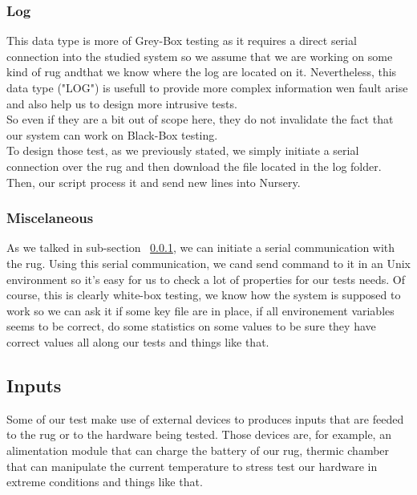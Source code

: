 \documentclass[12pt]{article}
\begin{document}
\subsubsection{Log}
\label{subsec:log}

This data type is more of Grey-Box testing as it requires a direct serial connection into the studied system so we assume that we  are working on some kind of \gls{rug} andthat we know where the log are located on it. Nevertheless, this data type ("LOG") is usefull to provide more complex information wen fault arise and also help us to design more intrusive tests.\\

So even if they are a bit out of scope here, they do not invalidate the fact that our system can work on Black-Box testing.\\

To design those test, as we previously stated, we simply initiate a serial connection over the \gls{rug} and then download the file located in the log folder. Then, our script process it and send new lines into Nursery.

\subsubsection{Miscelaneous}
\label{subsec:misc}

As we talked in sub-section ~\ref{subsec:log}, we can initiate a serial communication with the \gls{rug}. Using this serial communication, we cand send command to it in an Unix environment so it's easy for us to check a lot of properties for our tests needs. Of course, this is clearly white-box testing, we know how the system is supposed to work so we can ask it if some key file are in place, if all environement variables seems to be correct, do some statistics on some values to be sure they have correct values all along our tests and things like that.\\

\subsection{Inputs}

Some of our test make use of external devices to produces inputs that are feeded to the \gls{rug} or to the hardware being tested. Those devices are, for example, an alimentation module that can charge the battery of our \gls{rug}, thermic chamber that can manipulate the current temperature to stress test our hardware in extreme conditions and things like that.\\
\end{document}

